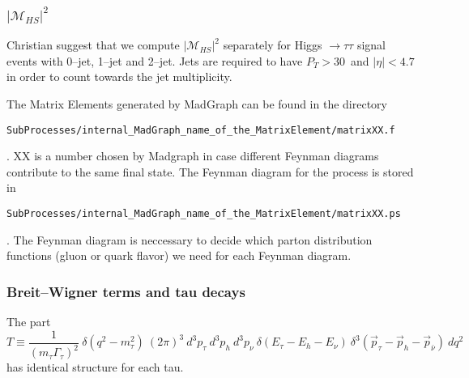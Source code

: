 \subsubsection{$\vert \mathcal{M}_{HS} \vert^2$}

Christian suggest that we compute $\vert \mathcal{M}_{HS} \vert^2$ separately for Higgs $\rightarrow \tau\tau$ signal events with 0--jet, 1--jet and 2--jet.
Jets are required to have $P_{T} > 30$~\GeV and $\vert \eta \vert < 4.7$ in order to count towards the jet multiplicity.

The Matrix Elements generated by MadGraph can be found in the directory \begin{verbatim}SubProcesses/internal_MadGraph_name_of_the_MatrixElement/matrixXX.f\end{verbatim} .
XX is a number chosen by Madgraph in case different Feynman diagrams contribute to the same final state.
The Feynman diagram for the process is stored in \begin{verbatim}SubProcesses/internal_MadGraph_name_of_the_MatrixElement/matrixXX.ps\end{verbatim} .
The Feynman diagram is neccessary to decide which parton distribution functions (gluon or quark flavor) we need for each Feynman diagram.


\subsubsection{Breit--Wigner terms and tau decays}

The part
\begin{equation*}
T \equiv \frac{1}{(m_{\tau}\Gamma_{\tau})^{2}} \ \delta(q^2 - m_{\tau}^2) 
  \ (2\pi)^3 \ d^3p_{\tau} \ d^3p_{h} \ d^3p_{\nu} \ \delta(E_{\tau} - E_{h} - E_{\nu}) \ \delta^3(\vec{p}_{\tau} - \vec{p}_{h} - \vec{p}_{\bar{\nu}}) \ dq^2
\end{equation*}
has identical structure for each tau.

